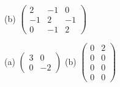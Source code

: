 (b) $\begin{pmatrix}
    2 & -1 & 0 \\
    -1 & 2 & -1 \\
    0 & -1 & 2
\end{pmatrix}
$



(a) $\begin{pmatrix}
    3 & 0 \\
    0 & -2
\end{pmatrix}
$
(b) $
\begin{pmatrix}
    0 & 2 \\
    0 & 0 \\
    0 & 0 \\
    0 & 0
\end{pmatrix}
$



